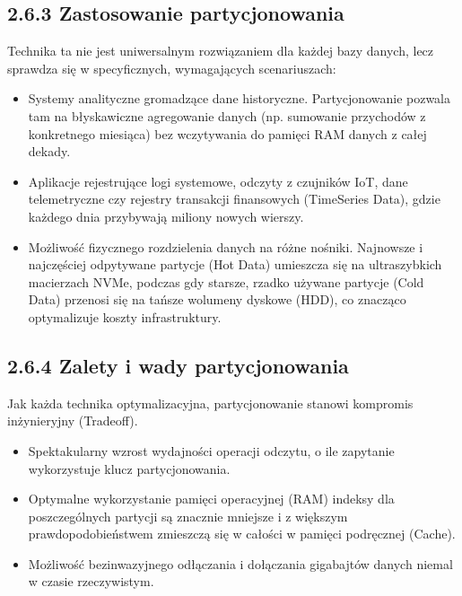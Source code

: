 \documentclass[a4paper,11pt,english,openany,oneside]{sphinxmanual}
\begin{document}
\subsection{2.6.3 Zastosowanie partycjonowania}
\label{\detokenize{rozdzial_2/rozdzial_26/index:zastosowanie-partycjonowania}}
\sphinxAtStartPar
Technika ta nie jest uniwersalnym rozwiązaniem dla każdej bazy danych, lecz sprawdza się w specyficznych, wymagających scenariuszach:
\begin{itemize}
\item {} 
\sphinxAtStartPar
{} Systemy analityczne gromadzące dane historyczne. Partycjonowanie pozwala tam na błyskawiczne agregowanie danych (np. sumowanie przychodów z konkretnego miesiąca) bez wczytywania do pamięci RAM danych z całej dekady.

\item {} 
\sphinxAtStartPar
{} Aplikacje rejestrujące logi systemowe, odczyty z czujników IoT, dane telemetryczne czy rejestry transakcji finansowych (Time\sphinxhyphen{}Series Data), gdzie każdego dnia przybywają miliony nowych wierszy.

\item {} 
\sphinxAtStartPar
{} Możliwość fizycznego rozdzielenia danych na różne nośniki. Najnowsze i najczęściej odpytywane partycje (Hot Data) umieszcza się na ultra\sphinxhyphen{}szybkich macierzach NVMe, podczas gdy starsze, rzadko używane partycje (Cold Data) przenosi się na tańsze wolumeny dyskowe (HDD), co znacząco optymalizuje koszty infrastruktury.

\end{itemize}


\subsection{2.6.4 Zalety i wady partycjonowania}
\label{\detokenize{rozdzial_2/rozdzial_26/index:zalety-i-wady-partycjonowania}}
\sphinxAtStartPar
Jak każda technika optymalizacyjna, partycjonowanie stanowi kompromis inżynieryjny (Trade\sphinxhyphen{}off).

\sphinxAtStartPar
{}
\begin{itemize}
\item {} 
\sphinxAtStartPar
Spektakularny wzrost wydajności operacji odczytu, o ile zapytanie wykorzystuje klucz partycjonowania.

\item {} 
\sphinxAtStartPar
Optymalne wykorzystanie pamięci operacyjnej (RAM) \textendash{} indeksy dla poszczególnych partycji są znacznie mniejsze i z większym prawdopodobieństwem zmieszczą się w całości w pamięci podręcznej (Cache).

\item {} 
\sphinxAtStartPar
Możliwość bezinwazyjnego odłączania i dołączania gigabajtów danych niemal w czasie rzeczywistym.

\end{itemize}
\end{document}
